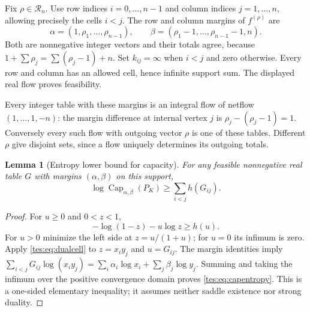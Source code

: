 \documentclass[11pt,a4paper]{article}
\newtheorem{lemma}[theorem]{Lemma}
\theoremstyle{remark}\newtheorem{remark}[theorem]{Remark}
\renewcommand{\Cap}{\operatorname{Cap}}\newcommand{\CT}{\operatorname{CT}}
\numberwithin{equation}{section}
\begin{document}
Fix $\rho\in\mathcal R_n$. Use row indices $i=0,\ldots,n-1$ and column indices $j=1,\ldots,n$, allowing precisely the cells $i<j$. The row and column margins of $f^{(\rho)}$ are
\begin{equation}\label{tes:eq:margins}
\alpha=(1,\rho_1,\ldots,\rho_{n-1}),\qquad
\beta=(\rho_1-1,\ldots,\rho_{n-1}-1,n).
\end{equation}
Both are nonnegative integer vectors and their totals agree, because
$1+\sum\rho_j=\sum(\rho_j-1)+n$. Set $k_{ij}=\infty$ when $i<j$ and zero otherwise. Every row and column has an allowed cell, hence infinite support sum. The displayed real flow proves feasibility.

Every integer table with these margins is an integral flow of netflow $(1,\ldots,1,-n)$: the margin difference at internal vertex $j$ is $\rho_j-(\rho_j-1)=1$. Conversely every such flow with outgoing vector $\rho$ is one of these tables. Different $\rho$ give disjoint sets, since a flow uniquely determines its outgoing totals.

\begin{lemma}[Entropy lower bound for capacity]\label{tes:lem:capacityentropy}
For any feasible nonnegative real table $G$ with margins $(\alpha,\beta)$ on this support,
\begin{equation}\label{tes:eq:capentropy}
\log\Cap_{\alpha,\beta}(P_K)\ge\sum_{i<j}h(G_{ij}).
\end{equation}
\end{lemma}
\begin{proof}
For $u\ge0$ and $0<z<1$,
\begin{equation}\label{tes:eq:dualcell}
-\log(1-z)-u\log z\ge h(u).
\end{equation}
For $u>0$ minimize the left side at $z=u/(1+u)$; for $u=0$ its infimum is zero. Apply \eqref{tes:eq:dualcell} to $z=x_iy_j$ and $u=G_{ij}$. The margin identities imply
$\sum_{i<j}G_{ij}\log(x_i y_j)=\sum_i\alpha_i\log x_i+\sum_j\beta_j\log y_j$.
Summing and taking the infimum over the positive convergence domain proves \eqref{tes:eq:capentropy}. This is a one-sided elementary inequality; it assumes neither saddle existence nor strong duality.
\end{proof}
\end{document}
